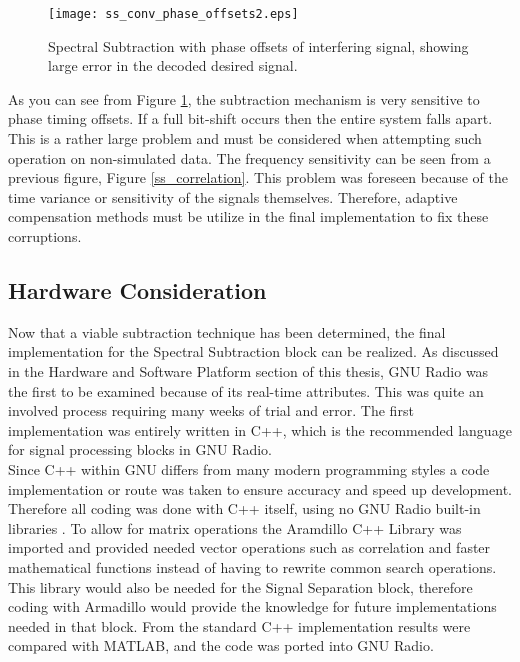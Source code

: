\begin{figure}[!ht]\label{shifting}
\centering
\texttt{[image: ss\_conv\_phase\_offsets2.eps]}
\caption{Spectral Subtraction with phase offsets of interfering signal, showing large error in the decoded desired signal.}
\end{figure}

As you can see from Figure \ref{shifting}, the subtraction mechanism is very sensitive to phase timing offsets.  If a full bit-shift occurs then the entire system falls apart.  This is a rather large problem and must be considered when attempting such operation on non-simulated data.  The frequency sensitivity can be seen from a previous figure, Figure \ref{ss_correlation}.  This problem was foreseen because of the time variance or sensitivity of the signals themselves.  Therefore, adaptive compensation methods must be utilize in the final implementation to fix these corruptions.\\

\subsection{Hardware Consideration}

Now that a viable subtraction technique has been determined, the final implementation for the Spectral Subtraction block can be realized.  As discussed in the Hardware and Software Platform section of this thesis, GNU Radio was the first to be examined because of its real-time attributes.  This was quite an involved process requiring many weeks of trial and error.  The first implementation was entirely written in C++, which is the recommended language for signal processing blocks in GNU Radio.\\  

Since C++ within GNU differs from many modern programming styles a code implementation or route was taken to ensure accuracy and speed up development.  Therefore all coding was done with C++ itself, using no GNU Radio built-in libraries \cite{gnuradioCPP}.  To allow for matrix operations the Aramdillo C++ Library \cite{armadillo} was imported and provided needed vector operations such as correlation and faster mathematical functions instead of having to rewrite common search operations.  This library would also be needed for the Signal Separation block, therefore coding with Armadillo would provide the knowledge for future implementations needed in that block.  From the standard C++ implementation results were compared with MATLAB, and the code was ported into GNU Radio.\\

